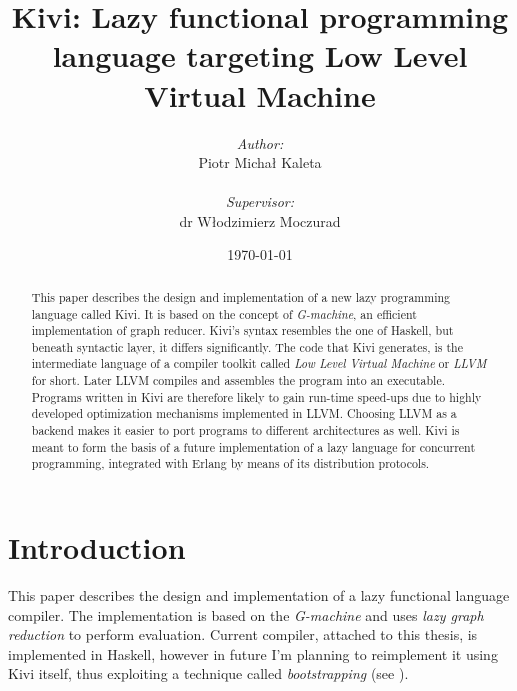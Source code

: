 \documentclass[12pt,a4paper]{report}
\begin{document}
\title{Kivi: Lazy functional programming language targeting Low Level Virtual Machine}
\author{\textit{Author:}\\Piotr Micha\l{} Kaleta\\\\\emph{Supervisor:}\\dr W\l{}odzimierz Moczurad}
\date{\today}

\maketitle

\newpage
\thispagestyle{empty}
\mbox{}

\onehalfspace

\Huge
\begin{abstract}
  \normalsize
  \center
  This paper describes the design and implementation of a new lazy programming
  language called Kivi. It is based on the concept of \textit{G-machine}, an
  efficient implementation of graph reducer. Kivi's syntax resembles the one of
  Haskell, but beneath syntactic layer, it differs significantly. The code that
  Kivi generates, is the intermediate language of a compiler toolkit called
  \textit{Low Level Virtual Machine}\cite{website:llvm} or \textit{LLVM} for
  short.  Later LLVM compiles and assembles the program into an executable.
  Programs written in Kivi are therefore likely to gain run-time speed-ups due
  to highly developed optimization mechanisms implemented in LLVM. Choosing
  LLVM as a backend makes it easier to port programs to different architectures
  as well.  Kivi is meant to form the basis of a future implementation of a
  lazy language for concurrent programming, integrated with Erlang by means of
  its distribution protocols.
\end{abstract}

\normalsize

\tableofcontents

\chapter{Introduction}

This paper describes the design and implementation of a lazy functional
language compiler. The implementation is based on the
\textit{G-machine}\cite{Jon87} and uses \textit{lazy graph reduction} to
perform evaluation. Current compiler, attached to this thesis, is implemented
in Haskell, however in future I'm planning to reimplement it using Kivi itself,
thus exploiting a technique called \textit{bootstrapping} (see
\cite{wiki:bootstrapping}).
\end{document}
